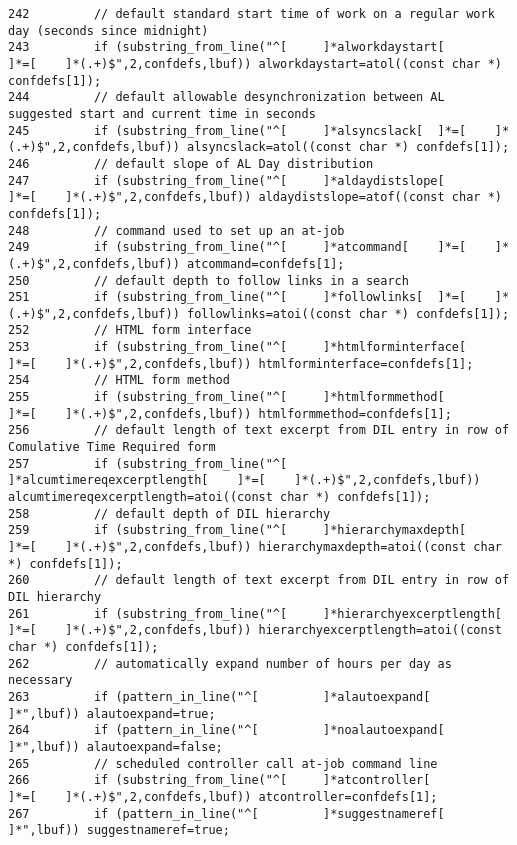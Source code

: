 \begin{verbatim}
242         // default standard start time of work on a regular work day (seconds since midnight)
243         if (substring_from_line("^[     ]*alworkdaystart[       ]*=[    ]*(.+)$",2,confdefs,lbuf)) alworkdaystart=atol((const char *) confdefs[1]);
244         // default allowable desynchronization between AL suggested start and current time in seconds
245         if (substring_from_line("^[     ]*alsyncslack[  ]*=[    ]*(.+)$",2,confdefs,lbuf)) alsyncslack=atol((const char *) confdefs[1]);
246         // default slope of AL Day distribution
247         if (substring_from_line("^[     ]*aldaydistslope[       ]*=[    ]*(.+)$",2,confdefs,lbuf)) aldaydistslope=atof((const char *) confdefs[1]);
248         // command used to set up an at-job
249         if (substring_from_line("^[     ]*atcommand[    ]*=[    ]*(.+)$",2,confdefs,lbuf)) atcommand=confdefs[1];
250         // default depth to follow links in a search
251         if (substring_from_line("^[     ]*followlinks[  ]*=[    ]*(.+)$",2,confdefs,lbuf)) followlinks=atoi((const char *) confdefs[1]);
252         // HTML form interface
253         if (substring_from_line("^[     ]*htmlforminterface[    ]*=[    ]*(.+)$",2,confdefs,lbuf)) htmlforminterface=confdefs[1];
254         // HTML form method
255         if (substring_from_line("^[     ]*htmlformmethod[       ]*=[    ]*(.+)$",2,confdefs,lbuf)) htmlformmethod=confdefs[1];
256         // default length of text excerpt from DIL entry in row of Comulative Time Required form
257         if (substring_from_line("^[     ]*alcumtimereqexcerptlength[    ]*=[    ]*(.+)$",2,confdefs,lbuf)) alcumtimereqexcerptlength=atoi((const char *) confdefs[1]);
258         // default depth of DIL hierarchy
259         if (substring_from_line("^[     ]*hierarchymaxdepth[    ]*=[    ]*(.+)$",2,confdefs,lbuf)) hierarchymaxdepth=atoi((const char *) confdefs[1]);
260         // default length of text excerpt from DIL entry in row of DIL hierarchy
261         if (substring_from_line("^[     ]*hierarchyexcerptlength[       ]*=[    ]*(.+)$",2,confdefs,lbuf)) hierarchyexcerptlength=atoi((const char *) confdefs[1]);
262         // automatically expand number of hours per day as necessary
263         if (pattern_in_line("^[         ]*alautoexpand[         ]*",lbuf)) alautoexpand=true;
264         if (pattern_in_line("^[         ]*noalautoexpand[       ]*",lbuf)) alautoexpand=false;
265         // scheduled controller call at-job command line
266         if (substring_from_line("^[     ]*atcontroller[         ]*=[    ]*(.+)$",2,confdefs,lbuf)) atcontroller=confdefs[1];
267         if (pattern_in_line("^[         ]*suggestnameref[       ]*",lbuf)) suggestnameref=true;

\end{verbatim}
